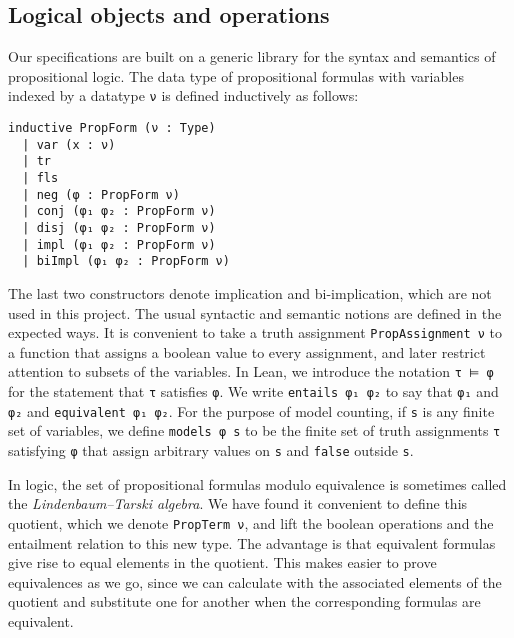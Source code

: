 \subsection{Logical objects and operations}

Our specifications are built on a generic library for the syntax and semantics of
propositional logic. The data type of propositional formulas with variables indexed by
a datatype \lstinline{ν} is defined inductively as follows:
\begin{lstlisting}
inductive PropForm (ν : Type)
  | var (x : ν)
  | tr
  | fls
  | neg (φ : PropForm ν)
  | conj (φ₁ φ₂ : PropForm ν)
  | disj (φ₁ φ₂ : PropForm ν)
  | impl (φ₁ φ₂ : PropForm ν)
  | biImpl (φ₁ φ₂ : PropForm ν)
\end{lstlisting}
The last two constructors denote implication and bi-implication, which are not used in this
project. The usual syntactic and semantic notions are defined in the expected ways.
It is convenient to take a truth assignment \lstinline{PropAssignment ν} to a function that
assigns a boolean value to every assignment, and later restrict attention to subsets of the
variables. In Lean, we introduce the notation \lstinline{τ ⊨ φ} for the statement that
\lstinline{τ} satisfies \lstinline{φ}. We write \lstinline{entails φ₁ φ₂} to say that
\lstinline{φ₁} and \lstinline{φ₂} and \lstinline{equivalent φ₁ φ₂}.
For the purpose of model counting, if \lstinline{s} is any finite set of variables,
we define \lstinline{models φ s} to be the finite set of truth assignments \lstinline{τ}
satisfying \lstinline{φ} that assign arbitrary values on \lstinline{s} and
\lstinline{false} outside \lstinline{s}.

In logic, the set of propositional formulas modulo equivalence is sometimes called the \emph{Lindenbaum--Tarski algebra}. We have found it convenient to define this quotient,
which we denote \lstinline{PropTerm ν}, and lift the boolean operations and the entailment
relation to this new type. The advantage is that equivalent formulas give
rise to equal elements in the quotient.
This makes easier to prove equivalences as we go, since we can calculate with the associated
elements of the quotient and substitute one for another when the corresponding formulas are equivalent.

